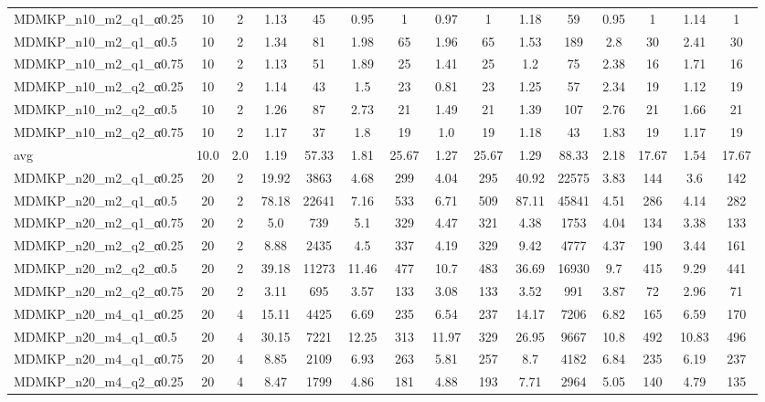 \begin{table}[!ht]
{\begin{tabular}{lcccccccccccccc}
MDMKP\_n10\_m2\_q1\_α0.25 & 10 & 2 & 1.13 & 45 & 0.95 & 1 & 0.97 & 1 & 1.18 & 59 & 0.95 & 1 & 1.14 & 1 \\
MDMKP\_n10\_m2\_q1\_α0.5 & 10 & 2 & 1.34 & 81 & 1.98 & 65 & 1.96 & 65 & 1.53 & 189 & 2.8 & 30 & 2.41 & 30 \\
MDMKP\_n10\_m2\_q1\_α0.75 & 10 & 2 & 1.13 & 51 & 1.89 & 25 & 1.41 & 25 & 1.2 & 75 & 2.38 & 16 & 1.71 & 16 \\
MDMKP\_n10\_m2\_q2\_α0.25 & 10 & 2 & 1.14 & 43 & 1.5 & 23 & 0.81 & 23 & 1.25 & 57 & 2.34 & 19 & 1.12 & 19 \\
MDMKP\_n10\_m2\_q2\_α0.5 & 10 & 2 & 1.26 & 87 & 2.73 & 21 & 1.49 & 21 & 1.39 & 107 & 2.76 & 21 & 1.66 & 21 \\
MDMKP\_n10\_m2\_q2\_α0.75 & 10 & 2 & 1.17 & 37 & 1.8 & 19 & 1.0 & 19 & 1.18 & 43 & 1.83 & 19 & 1.17 & 19 \\
\hline avg & 10.0 & 2.0 & 1.19& 57.33 & 1.81& 25.67 & 1.27& 25.67 & 1.29& 88.33 & 2.18& 17.67 & 1.54& 17.67\\ \hline
MDMKP\_n20\_m2\_q1\_α0.25 & 20 & 2 & 19.92 & 3863 & 4.68 & 299 & 4.04 & 295 & 40.92 & 22575 & 3.83 & 144 & 3.6 & 142 \\
MDMKP\_n20\_m2\_q1\_α0.5 & 20 & 2 & 78.18 & 22641 & 7.16 & 533 & 6.71 & 509 & 87.11 & 45841 & 4.51 & 286 & 4.14 & 282 \\
MDMKP\_n20\_m2\_q1\_α0.75 & 20 & 2 & 5.0 & 739 & 5.1 & 329 & 4.47 & 321 & 4.38 & 1753 & 4.04 & 134 & 3.38 & 133 \\
MDMKP\_n20\_m2\_q2\_α0.25 & 20 & 2 & 8.88 & 2435 & 4.5 & 337 & 4.19 & 329 & 9.42 & 4777 & 4.37 & 190 & 3.44 & 161 \\
MDMKP\_n20\_m2\_q2\_α0.5 & 20 & 2 & 39.18 & 11273 & 11.46 & 477 & 10.7 & 483 & 36.69 & 16930 & 9.7 & 415 & 9.29 & 441 \\
MDMKP\_n20\_m2\_q2\_α0.75 & 20 & 2 & 3.11 & 695 & 3.57 & 133 & 3.08 & 133 & 3.52 & 991 & 3.87 & 72 & 2.96 & 71 \\
MDMKP\_n20\_m4\_q1\_α0.25 & 20 & 4 & 15.11 & 4425 & 6.69 & 235 & 6.54 & 237 & 14.17 & 7206 & 6.82 & 165 & 6.59 & 170 \\
MDMKP\_n20\_m4\_q1\_α0.5 & 20 & 4 & 30.15 & 7221 & 12.25 & 313 & 11.97 & 329 & 26.95 & 9667 & 10.8 & 492 & 10.83 & 496 \\
MDMKP\_n20\_m4\_q1\_α0.75 & 20 & 4 & 8.85 & 2109 & 6.93 & 263 & 5.81 & 257 & 8.7 & 4182 & 6.84 & 235 & 6.19 & 237 \\
MDMKP\_n20\_m4\_q2\_α0.25 & 20 & 4 & 8.47 & 1799 & 4.86 & 181 & 4.88 & 193 & 7.71 & 2964 & 5.05 & 140 & 4.79 & 135 \\

\end{tabular}}
\end{table}
